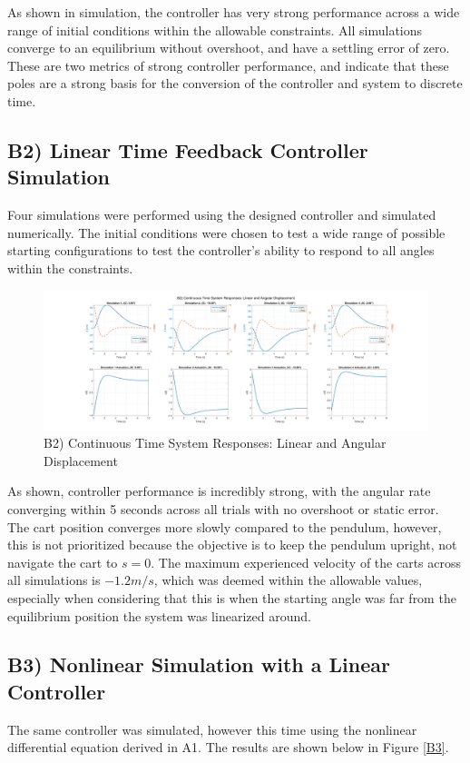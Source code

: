 \documentclass{article}
\begin{document}
As shown in simulation, the controller has very strong performance across a wide range of initial conditions within the allowable constraints. All simulations converge to an equilibrium without overshoot, and have a settling error of zero. These are two metrics of strong controller performance, and indicate that these poles are a strong basis for the conversion of the controller and system to discrete time.

\subsection*{B2) Linear Time Feedback Controller Simulation}
Four simulations were performed using the designed controller and simulated numerically. The initial conditions were chosen to test a wide range of possible starting configurations to test the controller's ability to respond to all angles within the constraints.

\begin{figure}[H]
    \centering
    \includegraphics[width=\textwidth]{figures/b2.png}
    \caption{B2) Continuous Time System Responses: Linear and Angular Displacement}
    \label{b2}
\end{figure}

As shown, controller performance is incredibly strong, with the angular rate converging within 5 seconds across all trials with no overshoot or static error. The cart position converges more slowly compared to the pendulum, however, this is not prioritized because the objective is to keep the pendulum upright, not navigate the cart to $s=0$. The maximum experienced velocity of the carts across all simulations is $-1.2m/s$, which was deemed within the allowable values, especially when considering that this is when the starting angle was far from the equilibrium position the system was linearized around. 

\subsection*{B3) Nonlinear Simulation with a Linear Controller}
The same controller was simulated, however this time using the nonlinear differential equation derived in A1. The results are shown below in Figure \ref{B3}.
\end{document}
